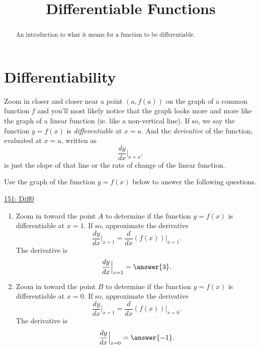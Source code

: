 \documentclass{ximera}
\title{Differentiable Functions}
\begin{document}
\begin{abstract}
An introduction to what it means for a function to be differentiable.
\end{abstract}
\maketitle

\section{Differentiability}
Zoom in closer and closer near a point $(a,f(a))$ on the graph of a common function $f$ and you'll most likely notice that the graph looks more and more like the graph of a linear function (ie. like a non-vertical line). If so, we say the function $y=f(x)$ is \emph{differentiable} at $x=a$. And the \emph{derivative} of the function, evaluated at $x=a$, written as
\[
     \frac{dy}{dx}\Big|_{x=a},
\]
is just the slope of that line or the rate of change of the linear function.

\begin{exploration}  \label{Exp:34gt4trt}
Use the graph of the function $y=f(x)$ below to answer the following questions.

\begin{onlineOnly}
    \begin{center}
\end{center}
\end{onlineOnly}

\href{https://www.desmos.com/calculator/ojdj4r3r9v}{151: Diff0}

\begin{enumerate}
\item Zoom in toward the point $A$ to determine if the function $y=f(x)$ is differentiable at $x=1$. If so, approximate the derivative
\[
      \frac{dy}{dx}\Big|_{x=1} = \frac{d}{dx}\left( f(x) \right) \Big|_{x=1}.
\]
The derivative is
\[
       \frac{dy}{dx}\Big|_{x=1} = \answer{3} .
\]

\item Zoom in toward the point $B$ to determine if the function $y=f(x)$ is differentiable at $x=0$. If so, approximate the derivative
\[
      \frac{dy}{dx}\Big|_{x=1} = \frac{d}{dx}\left( f(x) \right) \Big|_{x=0}.
\]
The derivative is
\[
       \frac{dy}{dx}\Big|_{x=0} = \answer{-1} .
\]
\end{enumerate}


\end{exploration}
\end{document}

